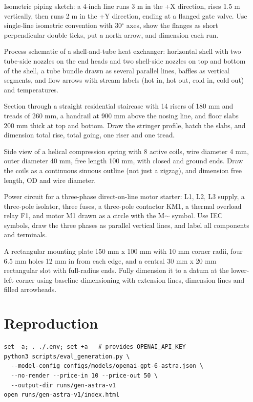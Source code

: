 \documentclass[11pt,a4paper]{article}
\begin{document}
\begin{description}[style=nextline,leftmargin=1em]
\item[\texttt{pipe\_isometric}] Isometric piping sketch: a 4-inch line runs 3 m in the +X direction, rises 1.5 m vertically, then runs 2 m in the +Y direction, ending at a flanged gate valve. Use single-line isometric convention with 30$^{\circ}$ axes, show the flanges as short perpendicular double ticks, put a north arrow, and dimension each run.
\item[\texttt{shell\_tube\_hx}] Process schematic of a shell-and-tube heat exchanger: horizontal shell with two tube-side nozzles on the end heads and two shell-side nozzles on top and bottom of the shell, a tube bundle drawn as several parallel lines, baffles as vertical segments, and flow arrows with stream labels (hot in, hot out, cold in, cold out) and temperatures.
\item[\texttt{staircase\_section}] Section through a straight residential staircase with 14 risers of 180 mm and treads of 260 mm, a handrail at 900 mm above the nosing line, and floor slabs 200 mm thick at top and bottom. Draw the stringer profile, hatch the slabs, and dimension total rise, total going, one riser and one tread.
\item[\texttt{compression\_spring}] Side view of a helical compression spring with 8 active coils, wire diameter 4 mm, outer diameter 40 mm, free length 100 mm, with closed and ground ends. Draw the coils as a continuous sinuous outline (not just a zigzag), and dimension free length, OD and wire diameter.
\item[\texttt{three\_phase\_motor\_starter}] Power circuit for a three-phase direct-on-line motor starter: L1, L2, L3 supply, a three-pole isolator, three fuses, a three-pole contactor KM1, a thermal overload relay F1, and motor M1 drawn as a circle with the M$\sim$ symbol. Use IEC symbols, draw the three phases as parallel vertical lines, and label all components and terminals.
\item[\texttt{dimensioned\_plate}] A rectangular mounting plate 150 mm x 100 mm with 10 mm corner radii, four 6.5 mm holes 12 mm in from each edge, and a central 30 mm x 20 mm rectangular slot with full-radius ends. Fully dimension it to a datum at the lower-left corner using baseline dimensioning with extension lines, dimension lines and filled arrowheads.
\end{description}

\section{Reproduction}
\begin{verbatim}
set -a; . ./.env; set +a   # provides OPENAI_API_KEY
python3 scripts/eval_generation.py \
  --model-config configs/models/openai-gpt-6-astra.json \
  --no-render --price-in 10 --price-out 50 \
  --output-dir runs/gen-astra-v1
open runs/gen-astra-v1/index.html
\end{verbatim}
\end{document}
